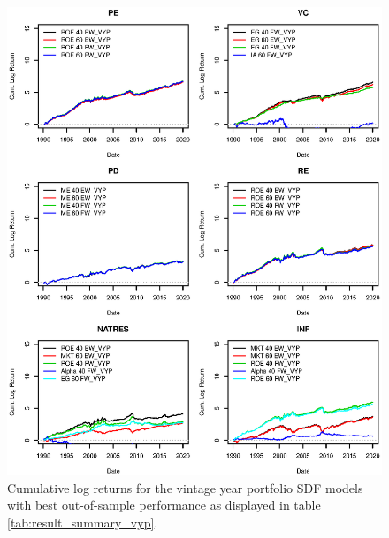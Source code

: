 \documentclass[12pt]{article}
\begin{document}
\begin{figure}[h]
	\centering
	\includegraphics{eps/0_SDF_realizations_vyp}
	\caption{Cumulative log returns for the vintage year portfolio SDF models with best out-of-sample performance as displayed in table \ref{tab:result_summary_vyp}.
	}
	\label{fig:sdf_log_returns_vyp}
\end{figure}


\newpage
\end{document}
